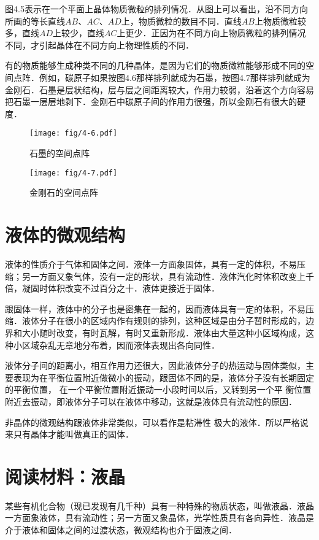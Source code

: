图4.5表示在一个平面上晶体物质微粒的排列情况．从图上可以看出，沿不同方向所画的等长直线$AB$、$AC$、$AD$上，物质微粒的数目不同．直线$AB$上物质微粒较多，直线$AD$上较少，直线$AC$上更少．正因为在不同方向上物质微粒的排列情况不同，才引起晶体在不同方向上物理性质的不同．

有的物质能够生成种类不同的几种晶体，是因为它们的物质微粒能够形成不同的空间点阵．例如，碳原子如果按图4.6那样排列就成为石墨，按图4.7那样排列就成为金刚石．石墨是层状结构，层与层之间距离较大，作用力较弱，沿着这个方向容易把石墨一层层地剥下．金刚石中碳原子间的作用力很强，所以金刚石有很大的硬度．
\begin{figure}[htp]\centering
	\begin{minipage}[t]{0.48\textwidth}
		\centering
\texttt{[image: fig/4-6.pdf]}
\caption{石墨的空间点阵}
	\end{minipage}
	\begin{minipage}[t]{0.48\textwidth}
		\centering
\texttt{[image: fig/4-7.pdf]}
\caption{金刚石的空间点阵}
	\end{minipage}
\end{figure}


\section{液体的微观结构}
液体的性质介于气体和固体之间．液体一方面象固体，具有一定的体积，不易压缩；另一方面又象气体，没有一定的形状，具有流动性．液体汽化时体积改变上千倍，凝固时体积改变不过百分之十．液体更接近于固体．

跟固体一样，液体中的分子也是密集在一起的，因而液体具有一定的体积，不易压缩．液体分子在很小的区域内作有规则的排列，这种区域是由分子暂时形成的，边界和大小随时改变，有时瓦解，有时又重新形成．液体由大量这种小区域构成，这种小区域杂乱无章地分布着，因而液体表现出各向同性．

液体分子间的距离小，相互作用力还很大，因此液体分子的热运动与固体类似，主要表现为在平衡位置附近做微小的振动，跟固体不同的是，液体分子没有长期固定的平衡位置，
在一个平衡位置附近振动一小段时间以后，又转到另一个平
衡位置附近去振动，即液体分子可以在液体中移动，这就是液体具有流动性的原因．

非晶体的微观结构跟液体非常类似，可以看作是粘滞性
极大的液体．所以严格说来只有晶体才能叫做真正的固体．

\section*{阅读材料：液晶}
某些有机化合物（现已发现有几千种）具有一种特殊的物质状态，叫做液晶．液晶一方面象液体，具有流动性；另一方面又象晶体，光学性质具有各向异性．液晶是介于液体和固体之间的过渡状态，微观结构也介于固液之间．

